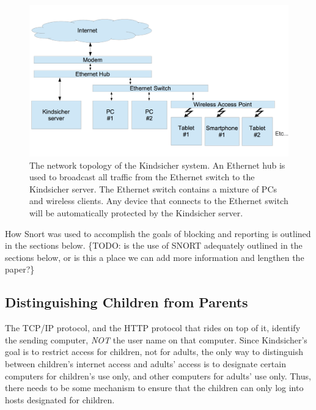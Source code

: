 \begin{figure}[!t]
    \centering
    \includegraphics[width=2\columnwidth]{figures/topology}
    \caption{The network topology of the Kindsicher system. An Ethernet hub is
        used to broadcast all traffic from the Ethernet switch to the
        Kindsicher server. The Ethernet switch contains a mixture of PCs and
        wireless clients. Any device that connects to the Ethernet switch will
        be automatically protected by the Kindsicher server.}
    \label{fig:topology}
\end{figure}

How Snort was used to accomplish the goals of blocking and reporting is outlined
in the sections below.
%
\{TODO: is the use of SNORT adequately outlined in the sections below, or is
this a place we can add more information and lengthen the paper?\}

\subsection{Distinguishing Children from Parents}

The TCP/IP protocol, and the HTTP protocol that rides on top of it, identify
the sending computer, \emph{NOT} the user name on that computer.
%
Since Kindsicher's goal is to restrict access for children, not for adults,
the only way to distinguish between children's internet access and adults'
access is to designate certain computers for children's use only, and other
computers for adults' use only.
%
Thus, there needs to be some mechanism to ensure that the children can only
log into hosts designated for children.

